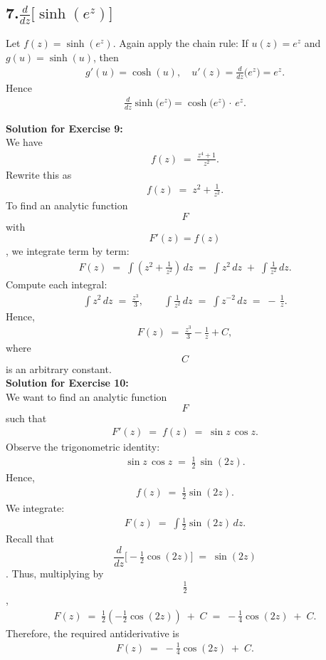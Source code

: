 \documentclass[12pt]{article}
\theoremstyle{definition} %
\theoremstyle{plain} %
\begin{document}
\subsection*{7.\quad $\displaystyle \frac{d}{dz}\bigl[\sinh(e^z)\bigr]$}

Let $f(z) = \sinh(e^z)$.  
Again apply the chain rule:  
If $u(z) = e^z$ and $g(u) = \sinh(u)$, then 
\begin{align}
g'(u) = \cosh(u),
\quad
u'(z) = \frac{d}{dz}\bigl(e^z\bigr) = e^z.
\end{align}
Hence
\begin{align}
\frac{d}{dz}\sinh\bigl(e^z\bigr)
  = 
  \cosh\bigl(e^z\bigr)\,\cdot\,e^z.
\end{align}

\textbf{Solution for Exercise 9:}\\

We have
\begin{align}
f(z) \;=\; \frac{z^4 + 1}{z^2}.
\end{align}
Rewrite this as 
\begin{align}
f(z) \;=\; z^2 + \frac{1}{z^2}.
\end{align}
To find an analytic function $$F$$ with $$F'(z) = f(z)$$, we integrate term by term:
\begin{align}
F(z)
\;=\; \int \left( z^2 + \frac{1}{z^2} \right) \, dz
\;=\; \int z^2 \, dz \;+\; \int \frac{1}{z^2} \, dz.
\end{align}
Compute each integral:
\begin{align}
\int z^2 \, dz \;=\; \frac{z^3}{3},
\qquad
\int \frac{1}{z^2} \, dz \;=\; \int z^{-2} \, dz \;=\; -\,\frac{1}{z}.
\end{align}
Hence,
\begin{align}
F(z)
\;=\;
\frac{z^3}{3}
-\frac{1}{z}
+ C,
\end{align}
where $$C$$ is an arbitrary constant. \\

\textbf{Solution for Exercise 10:}\\

We want to find an analytic function $$F$$ such that
\begin{align}
F'(z) \;=\; f(z) \;=\; \sin z \, \cos z.
\end{align}
Observe the trigonometric identity:
\begin{align}
\sin z \, \cos z \;=\; \tfrac12\,\sin(2z).
\end{align}
Hence,
\begin{align}
f(z) \;=\; \tfrac12 \sin(2z).
\end{align}
We integrate:
\begin{align}
F(z) 
\;=\;
\int \tfrac12 \sin(2z) \, dz.
\end{align}
Recall that 
$$\displaystyle \frac{d}{dz}\bigl[-\tfrac12 \cos(2z)\bigr] \;=\; \sin(2z)$$.
Thus, multiplying by $$\tfrac12$$,
\begin{align}
F(z)
\;=\;
\tfrac12 \left(-\tfrac12 \cos(2z)\right)
\;+\; C
\;=\;
-\tfrac14 \cos(2z)
\;+\; C.
\end{align}
Therefore, the required antiderivative is
\begin{align}
F(z) \;=\; -\tfrac14 \cos(2z) \;+\; C.
\end{align}
\end{document}
